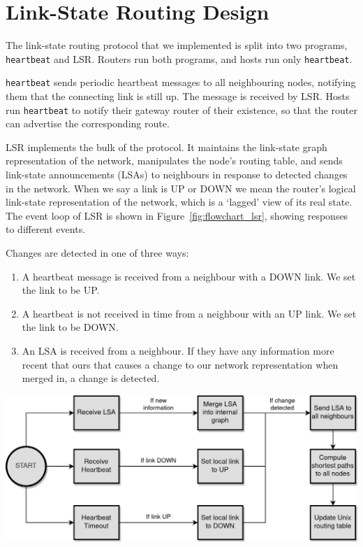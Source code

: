 \documentclass[withindex,glossary,openany]{cam-thesis}
\begin{document}
\section{Link-State Routing Design}
\label{sec:lsr_design}

The link-state routing protocol that we implemented is split into two programs, \texttt{heartbeat} and LSR.  Routers run both programs, and hosts run only \texttt{heartbeat}.

\texttt{heartbeat} sends periodic heartbeat messages to all neighbouring nodes, notifying them that the connecting link is still up. The message is received by LSR. Hosts run \texttt{heartbeat} to notify their gateway router of their existence, so that the router can advertise the corresponding route.

LSR implements the bulk of the protocol. It maintains the link-state graph representation of the network, manipulates the node's routing table, and sends link-state announcements (LSAs) to neighbours in response to detected changes in the network. When we say a link is UP or DOWN we mean the router's logical link-state representation of the network, which is a `lagged' view of its real state. The event loop of LSR is shown in Figure~\ref{fig:flowchart_lsr}, showing responses to different events.

Changes are detected in one of three ways:
\begin{enumerate}
	\item
	A heartbeat message is received from a neighbour with a DOWN link. We set the link to be UP.
	
	\item
	A heartbeat is not received in time from a neighbour with an UP link. We set the link to be DOWN.
	
	\item
	An LSA is received from a neighbour. If they have any information more recent that ours that causes a change to our network representation when merged in, a change is detected.
\end{enumerate}

\begin{center}
\begin{minipage}{0.9\textwidth} \centering
	\includegraphics[width=1\textwidth]{flowchart_lsr}
	\label{fig:flowchart_lsr}
\end{minipage}
\end{center}
\end{document}

